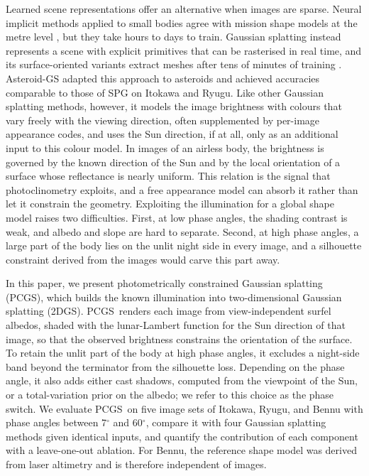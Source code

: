 \documentclass[fleqn,usenatbib]{aa}
\newcommand{\pcgs}{PCGS}
\begin{document}
Learned scene representations offer an alternative when images are sparse. Neural implicit methods applied to small
bodies agree with mission shape models at the metre level \citep{ChenS2024,ChenH2024,ChenH2025}, but they take hours
to days to train. Gaussian splatting \citep{Kerbl2023} instead represents a scene with explicit primitives that can be
rasterised in real time, and its surface-oriented variants extract meshes after tens of minutes of training
\citep{Huang2024,Yu2024GOF,Chen2024PGSR}. Asteroid-GS \citep{Zhang2025AsteroidGS} adapted this approach to asteroids
and achieved accuracies comparable to those of SPG on Itokawa and Ryugu. Like other Gaussian splatting methods,
however, it models the image brightness with colours that vary freely with the viewing direction, often supplemented by
per-image appearance codes, and uses the Sun direction, if at all, only as an additional input to this colour model. In images
of an airless body, the brightness is governed by the known direction of the Sun and by the local orientation of a
surface whose reflectance is nearly uniform. This relation is the signal that photoclinometry exploits, and a free appearance model can absorb it rather than let it constrain the geometry. Exploiting the illumination for a global shape model raises two difficulties. First, at low phase angles, the shading
contrast is weak, and albedo and slope are hard to separate. Second, at high phase angles, a large part of the body lies on the unlit night side in every image, and a
silhouette constraint derived from the images would carve this part away.

In this paper, we present photometrically constrained Gaussian splatting (\pcgs), which builds the known illumination
into two-dimensional Gaussian splatting (2DGS). \pcgs\ renders each image from view-independent surfel albedos, shaded
with the lunar-Lambert function for the Sun direction of that image, so that the observed brightness constrains the
orientation of the surface. To retain the unlit part of the body at high phase angles, it excludes a night-side band
beyond the terminator from the silhouette loss. Depending on the phase angle, it also adds either cast shadows,
computed from the viewpoint of the Sun, or a total-variation prior on the albedo; we refer to this choice as the phase
switch. We evaluate \pcgs\ on five image sets of Itokawa, Ryugu, and Bennu with phase angles between 7$^\circ$ and
60$^\circ$, compare it with four Gaussian splatting methods given identical inputs, and quantify the contribution of
each component with a leave-one-out ablation. For Bennu, the reference shape model was derived from laser altimetry and
is therefore independent of images.
\end{document}

